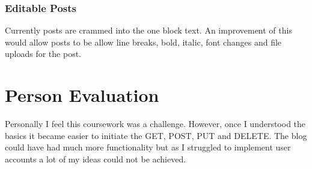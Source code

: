 \documentclass[10pt, a4paper]{article}
\begin{document}
\subsubsection{Editable Posts}
Currently posts are crammed into the one block text.  An improvement of this would allow posts to be allow line breaks, bold, italic, font changes and file uploads for the post. 

\section{Person Evaluation}
Personally I feel this coursework was a challenge.  However, once I understood the basics it became easier to initiate the GET, POST, PUT and DELETE. The blog could have had much more functionality but as I struggled to implement user accounts a lot of my ideas could not be achieved. 



		
\end{document}
